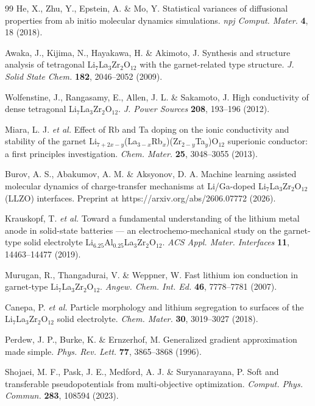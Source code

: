 \documentclass[11pt]{article}
\begin{document}
\begin{thebibliography}{99}
He, X., Zhu, Y., Epstein, A. \& Mo, Y. Statistical variances of diffusional
properties from ab initio molecular dynamics simulations. \emph{npj Comput.
Mater.} \textbf{4}, 18 (2018).

Awaka, J., Kijima, N., Hayakawa, H. \& Akimoto, J. Synthesis and structure
analysis of tetragonal Li$_7$La$_3$Zr$_2$O$_{12}$ with the garnet-related type
structure. \emph{J. Solid State Chem.} \textbf{182}, 2046--2052 (2009).

Wolfenstine, J., Rangasamy, E., Allen, J. L. \& Sakamoto, J. High conductivity
of dense tetragonal Li$_7$La$_3$Zr$_2$O$_{12}$. \emph{J. Power Sources}
\textbf{208}, 193--196 (2012).

Miara, L. J. \emph{et al.} Effect of Rb and Ta doping on the ionic conductivity
and stability of the garnet
Li$_{7+2x-y}$(La$_{3-x}$Rb$_x$)(Zr$_{2-y}$Ta$_y$)O$_{12}$ superionic conductor:
a first principles investigation. \emph{Chem. Mater.} \textbf{25}, 3048--3055
(2013).

Burov, A. S., Abakumov, A. M. \& Aksyonov, D. A. Machine learning assisted
molecular dynamics of charge-transfer mechanisms at Li/Ga-doped
Li$_7$La$_3$Zr$_2$O$_{12}$ (LLZO) interfaces. Preprint at
https://arxiv.org/abs/2606.07772 (2026).

Krauskopf, T. \emph{et al.} Toward a fundamental understanding of the lithium
metal anode in solid-state batteries --- an electrochemo-mechanical study on
the garnet-type solid electrolyte Li$_{6.25}$Al$_{0.25}$La$_3$Zr$_2$O$_{12}$.
\emph{ACS Appl. Mater. Interfaces} \textbf{11}, 14463--14477 (2019).

Murugan, R., Thangadurai, V. \& Weppner, W. Fast lithium ion conduction in
garnet-type Li$_7$La$_3$Zr$_2$O$_{12}$. \emph{Angew. Chem. Int. Ed.}
\textbf{46}, 7778--7781 (2007).

Canepa, P. \emph{et al.} Particle morphology and lithium segregation to surfaces
of the Li$_7$La$_3$Zr$_2$O$_{12}$ solid electrolyte. \emph{Chem. Mater.}
\textbf{30}, 3019--3027 (2018).

Perdew, J. P., Burke, K. \& Ernzerhof, M. Generalized gradient approximation
made simple. \emph{Phys. Rev. Lett.} \textbf{77}, 3865--3868 (1996).

Shojaei, M. F., Pask, J. E., Medford, A. J. \& Suryanarayana, P. Soft and
transferable pseudopotentials from multi-objective optimization.
\emph{Comput. Phys. Commun.} \textbf{283}, 108594 (2023).


\end{thebibliography}
\end{document}
